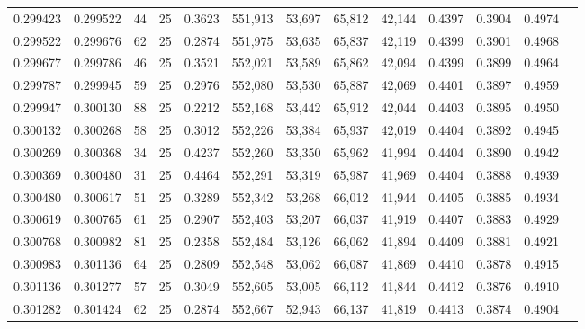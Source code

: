 \begin{tabular}{rrrrrrrrrrrrr}
0.299423 & 0.299522 &    44 &  25 &                                     0.3623 & 551,913 &  53,697 &  65,812 &  42,144 & 0.4397 & 0.3904 & 0.4974 \\
0.299522 & 0.299676 &    62 &  25 &                                     0.2874 & 551,975 &  53,635 &  65,837 &  42,119 & 0.4399 & 0.3901 & 0.4968 \\
0.299677 & 0.299786 &    46 &  25 &                                     0.3521 & 552,021 &  53,589 &  65,862 &  42,094 & 0.4399 & 0.3899 & 0.4964 \\
0.299787 & 0.299945 &    59 &  25 &                                     0.2976 & 552,080 &  53,530 &  65,887 &  42,069 & 0.4401 & 0.3897 & 0.4959 \\
0.299947 & 0.300130 &    88 &  25 &                                     0.2212 & 552,168 &  53,442 &  65,912 &  42,044 & 0.4403 & 0.3895 & 0.4950 \\
0.300132 & 0.300268 &    58 &  25 &                                     0.3012 & 552,226 &  53,384 &  65,937 &  42,019 & 0.4404 & 0.3892 & 0.4945 \\
0.300269 & 0.300368 &    34 &  25 &                                     0.4237 & 552,260 &  53,350 &  65,962 &  41,994 & 0.4404 & 0.3890 & 0.4942 \\
0.300369 & 0.300480 &    31 &  25 &                                     0.4464 & 552,291 &  53,319 &  65,987 &  41,969 & 0.4404 & 0.3888 & 0.4939 \\
0.300480 & 0.300617 &    51 &  25 &                                     0.3289 & 552,342 &  53,268 &  66,012 &  41,944 & 0.4405 & 0.3885 & 0.4934 \\
0.300619 & 0.300765 &    61 &  25 &                                     0.2907 & 552,403 &  53,207 &  66,037 &  41,919 & 0.4407 & 0.3883 & 0.4929 \\
0.300768 & 0.300982 &    81 &  25 &                                     0.2358 & 552,484 &  53,126 &  66,062 &  41,894 & 0.4409 & 0.3881 & 0.4921 \\
0.300983 & 0.301136 &    64 &  25 &                                     0.2809 & 552,548 &  53,062 &  66,087 &  41,869 & 0.4410 & 0.3878 & 0.4915 \\
0.301136 & 0.301277 &    57 &  25 &                                     0.3049 & 552,605 &  53,005 &  66,112 &  41,844 & 0.4412 & 0.3876 & 0.4910 \\
0.301282 & 0.301424 &    62 &  25 &                                     0.2874 & 552,667 &  52,943 &  66,137 &  41,819 & 0.4413 & 0.3874 & 0.4904 \\

\end{tabular}
